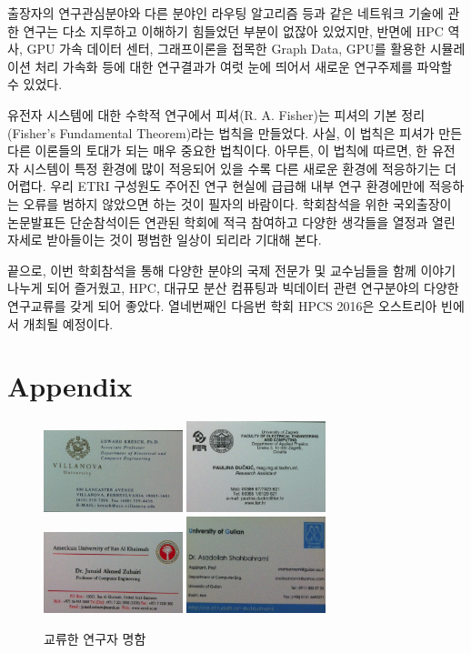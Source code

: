\documentclass[twocolumn]{article}
\begin{document}
출장자의 연구관심분야와 다른 분야인 라우팅 알고리즘 등과 같은 네트워크 기술에 관한 연구는 다소 지루하고 이해하기 힘들었던 부분이 없잖아 있었지만, 반면에 HPC 역사, GPU 가속 데이터 센터, 그래프이론을 접목한 Graph Data, GPU를 활용한 시뮬레이션 처리 가속화 등에 대한 연구결과가 여럿 눈에 띄어서 새로운 연구주제를 파악할 수 있었다.

유전자 시스템에 대한 수학적 연구에서 피셔(R. A. Fisher)는 피셔의 기본 정리 (Fisher's Fundamental Theorem)라는 법칙을 만들었다. 사실, 이 법칙은 피셔가 만든 다른 이론들의 토대가 되는 매우 중요한 법칙이다. 아무튼, 이 법칙에 따르면, 한 유전자 시스템이 특정 환경에 많이 적응되어 있을 수록 다른 새로운 환경에 적응하기는 더 어렵다. 우리 ETRI 구성원도 주어진 연구 현실에 급급해 내부 연구 환경에만에 적응하는 오류를 범하지 않았으면 하는 것이 필자의 바람이다. 학회참석을 위한 국외출장이 논문발표든 단순참석이든 연관된 학회에 적극 참여하고 다양한 생각들을 열정과 열린 자세로 받아들이는 것이 평범한 일상이 되리라 기대해 본다.

끝으로, 이번 학회참석을 통해 다양한 분야의 국제 전문가 및 교수님들을 함께 이야기 나누게 되어 즐거웠고, 
HPC, 대규모 분산 컴퓨팅과 빅데이터 관련 연구분야의 다양한 연구교류를 갖게 되어 좋았다. 
열네번째인 다음번 학회 HPCS 2016은 오스트리아 빈에서 개최될 예정이다.


\section*{Appendix}
\begin{figure}[htb]
        \centering
        \includegraphics[width=0.36\textwidth]{nc04.png}
        \includegraphics[width=0.36\textwidth]{nc05.png}
        \includegraphics[width=0.36\textwidth]{nc06.png}
        \includegraphics[width=0.36\textwidth]{nc07.png}
        \caption{교류한 연구자 명함}
        \label{fig:namecards02}
\end{figure}
\end{document}
